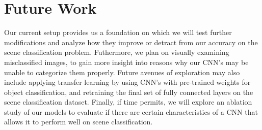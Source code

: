 \documentclass[10pt,twocolumn,letterpaper]{article}
\begin{document}
\section{Future Work}

Our current setup provides us a foundation on which we will test further
modifications and analyze how they improve or detract from our accuracy on the
scene classification problem. Futhermore, we plan on visually examining
misclassified images, to gain more insight into reasons why our CNN's may be
unable to categorize them properly. Future avenues of exploration may also
include applying transfer learning by using CNN's with pre-trained weights for
object classification, and retraining the final set of fully connected layers
on the scene classification dataset. Finally, if time permits, we will explore
an ablation study of our models to evaluate if there are certain
characteristics of a CNN that allows it to perform well on scene
classification.\\


\nocite{Lin}
\nocite{Wu}


{\small


}
\end{document}
